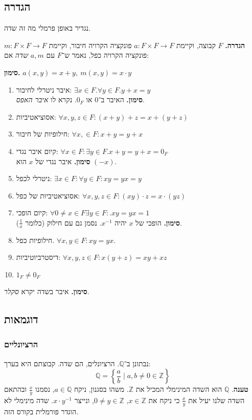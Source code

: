 \documentclass[]{article}
\newcommand\Z     {\mathbb{Z}}
\newcommand\Q     {\mathbb{Q}}
\newcommand\op    {^{-1}}
\begin{document}
	\subsection{הגדרה}
	נגדיר באופן פרמלי מה זה שדה. 
	
	\textbf{הגדרה. }$F$ קבוצה, וקיימת $a \colon F \times F \to F$ פונקציה הקרויה חיבור, וקיימת $m \colon F \times F \to F$ פונקציה הקרויה כפל, נאמר ש־$F$ עם $a, m$ \textit{שדה} אם: 
	
	\textbf{סימון. }\hfill $a(x, y) = x + y, \ m(x, y) = x \cdot y$
	
	\begin{enumerate}
		\item איבר ניטרלי לחיבור: \hfill $\exists x \in F. \forall y \in F. y + x = y$ \\
		\textbf{סימון. }האיבר ב־$0$ או $0_F$. נקרא לו \textit{איבר האפס}. 
		\item אסוציאטיביות: \hfill $\forall x, y, z \in F: (x + y) + z = x + (y + z)$
		\item חילופיות של חיבור: \hfill $\forall x,  \in F: x + y = y + x$
		\item קיום איבר נגדי: \hfill $\forall x \in F: \exists y \in F. x + y = y + x = 0_F$ \\
		\textbf{סימון. }איבר נגדי של $x$ הוא $(-x)$. 
		\item ניטרלי לכפל: \hfill $\exists x \in F \colon \forall y \in F \colon x y = y x = y$
		\item אסוציאטיביות של כפל: \hfill $\forall x , y, z \in F \colon (xy) \cdot z = x \cdot (yz)$
		\item קיום הופכי: \hfill $\forall 0 \neq x \in F \exists y \in F \colon. xy = yx = 1$ \\
		\textbf{סימון. }הופכי של $x$ יהיה $x\op$. נסמן גם עם חילוק (כלומר $\frac{1}{x}$). 
		\item חילופיות כפל. \hfill $\forall x, y \in F \colon xy = yx$. 
		\item דיסטרביוטיביות: \hfill $\forall x, y, z \in F \colon x(y + z) = xy + xz$
		\item \hfil $1_F \neq 0_F$ \hfil
	\end{enumerate}
	\textbf{סימון. }איבר בשדה יקרא \textit{סקלר}. 
	
	\subsection{דוגמאות}
	
	\subsubsection{הרציונליים}
	נבתונן ב־$\Q$. הרציונלים, הם שדה. קבוצתם היא בערך: 
	\[ \Q = \left \{\frac{a}{b} \mid a, b \neq 0 \in \Z \right \} \]
	\textbf{טענה}. $\Q$ הוא השדה המינימלי המכיל את $\Z$. משהו בסגנון, ניקח $a \in \Q$, נסמנו $\frac{x}{y}$ ובהתאם השדה שלנו יעיל את $\frac{x}{y}$ כי ניקח את $x \in \Z$, $0 \neq y \in \Z$, ונייצר $x \cdot y\op$. שדה מינימלי לא הוגדר פורמלית בקורס הזה. 
	
\end{document}
